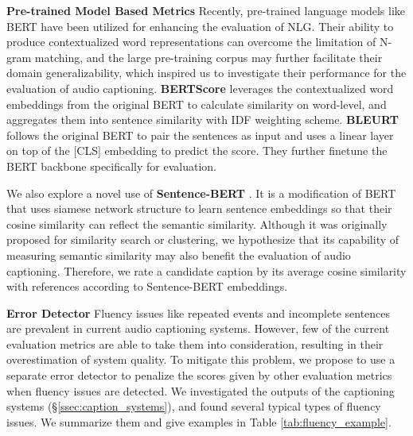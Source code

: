 \documentclass{article}
\begin{document}
 
\noindent\textbf{Pre-trained Model Based Metrics}
\label{sssec:bert_based_metrics}
\quad   Recently, pre-trained language models like BERT \cite{devlin2019bert} have been utilized for enhancing  the evaluation of NLG. Their ability to produce contextualized word representations can overcome the limitation of N-gram matching, and the large pre-training corpus may further facilitate their domain generalizability, which inspired us to investigate their performance for the evaluation of audio captioning. \textbf{BERTScore} \cite{zhang2019bertscore} leverages the contextualized word embeddings from the original BERT to calculate similarity on word-level, and aggregates them into sentence similarity with IDF weighting scheme. \textbf{BLEURT} \cite{sellam2020bleurt} follows the original BERT to pair the sentences as input and uses a linear layer on top of the [CLS] embedding to predict the score. They further finetune the BERT backbone specifically for evaluation.  

We also explore a novel use of \textbf{Sentence-BERT} \cite{reimers2019sentence}. It is a modification of BERT that uses siamese network structure to learn sentence embeddings so that their cosine similarity can reflect the semantic similarity. Although it was originally proposed for similarity search or clustering, we hypothesize that its capability of measuring semantic similarity may also benefit the evaluation of audio captioning. Therefore, we rate a candidate caption by its average cosine similarity with references according to Sentence-BERT embeddings.

\noindent\textbf{Error Detector}
\quad   Fluency issues like repeated events and incomplete sentences are prevalent in current audio captioning systems. However, few of the current evaluation metrics are able to take them into consideration, resulting in their overestimation of system quality. To mitigate this problem, we propose to use a separate error detector to penalize the scores given by other evaluation metrics when fluency issues are detected. 
We investigated the outputs of the captioning systems (\S \ref{ssec:caption_systems}), and found several typical types of fluency issues. We summarize them and give examples in Table \ref{tab:fluency_example}.
\end{document}
